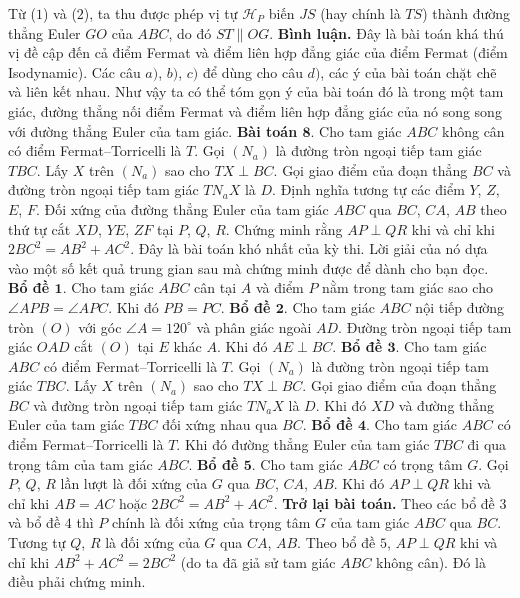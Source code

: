 \begin{multicols}{2}
	\vskip 0.1cm
	Từ ($1$) và ($2$), ta thu được phép vị tự $\mathcal{H}_P$ biến $JS$ (hay chính là $TS$) thành đường thẳng Euler $GO$ của $ABC$, do đó $ST\parallel OG$.
	\vskip 0.1cm
	{\bf\color{cackithi} Bình luận.} Đây là bài toán khá thú vị đề cập đến cả điểm Fermat và điểm liên hợp đẳng giác của điểm Fermat (điểm Isodynamic). Các câu $a)$, $b)$, $c)$ để dùng cho câu $d)$, các ý của bài toán chặt chẽ và liên kết nhau. Như vậy ta có thể tóm gọn ý của bài toán đó là trong một tam giác, đường thẳng nối điểm Fermat và điểm liên hợp đẳng giác của nó song song với đường thẳng Euler của tam giác.
	\vskip 0.1cm
	\textbf{\color{cackithi}Bài toán $\pmb{8.}$} Cho tam giác $ABC$ không cân có điểm Fermat--Torricelli là $T$. Gọi $(N_a)$ là đường tròn ngoại tiếp tam giác $TBC$. Lấy $X$ trên $(N_a)$ sao cho $TX\perp BC$. Gọi giao điểm của đoạn thẳng $BC$ và đường tròn ngoại tiếp tam giác $TN_aX$ là $D$. Định nghĩa tương tự các điểm $Y$, $Z$, $E$, $F$. Đối xứng của đường thẳng Euler của tam giác $ABC$ qua $BC$, $CA$, $AB$ theo thứ tự cắt $XD$, $YE$, $ZF$ tại $P$, $Q$, $R$. Chứng minh rằng $AP\perp QR$ khi và chỉ khi $2BC^2=AB^2+AC^2$.
	\vskip 0.1cm
	Đây là bài toán khó nhất của kỳ thi. Lời giải của nó dựa vào một số kết quả trung gian sau mà chứng minh được để dành cho bạn đọc.
	\vskip 0.1cm
	\textbf{\color{cackithi}Bổ đề $\pmb{1.}$} Cho tam giác $ABC$ cân tại $A$ và điểm $P$ nằm trong tam giác sao cho $\angle APB=\angle APC$. Khi đó $PB=PC$.
	\vskip 0.1cm
	\textbf{\color{cackithi}Bổ đề $\pmb{2.}$} Cho tam giác $ABC$ nội tiếp đường tròn $(O)$ với góc $\angle A=120^\circ$ và phân giác ngoài $AD$. Đường tròn ngoại tiếp tam giác $OAD$ cắt $(O)$ tại $E$ khác $A$. Khi đó $AE\perp BC$.
	\vskip 0.1cm
	\textbf{\color{cackithi}Bổ đề $\pmb{3.}$} Cho tam giác $ABC$ có điểm Fermat--Torricelli là $T$. Gọi $(N_a)$ là đường tròn ngoại tiếp tam giác $TBC$. Lấy $X$ trên $(N_a)$ sao cho $TX\perp BC$. Gọi giao điểm của đoạn thẳng $BC$ và đường tròn ngoại tiếp tam giác $TN_aX$ là $D$. Khi đó $XD$ và đường thẳng Euler của tam giác $TBC$ đối xứng nhau qua $BC$. 
	\vskip 0.1cm
	\textbf{\color{cackithi}Bổ đề $\pmb{4.}$} Cho tam giác $ABC$ có điểm Fermat--Torricelli là $T$. Khi đó đường thẳng Euler của tam giác $TBC$ đi qua trọng tâm của tam giác $ABC$.
	\vskip 0.1cm
	\textbf{\color{cackithi}Bổ đề $\pmb{5.}$} Cho tam giác $ABC$ có trọng tâm $G$. Gọi $P$, $Q$, $R$ lần lượt là đối xứng của $G$ qua $BC$, $CA$, $AB$. Khi đó $AP\perp QR$ khi và chỉ khi $AB=AC$ hoặc $2BC^2=AB^2+AC^2$.
	\vskip 0.1cm
	{\bf\color{cackithi} Trở lại bài toán.} Theo các bổ đề $3$ và bổ đề $4$ thì $P$ chính là đối xứng của trọng tâm $G$ của tam giác $ABC$ qua $BC$. Tương tự $Q$, $R$ là đối xứng của $G$ qua $CA$, $AB$. Theo bổ đề $5$, $AP\perp QR$ khi và chỉ khi $AB^2+AC^2=2BC^2$ (do ta đã giả sử tam giác $ABC$ không cân). Đó là điều phải chứng minh.

\end{multicols}

